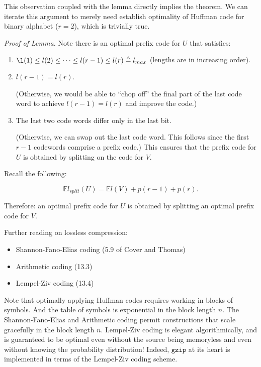 \documentclass[13pt]{article}
\newcommand{\EE}{\mathbb{E}}
\begin{document}
This observation coupled with the lemma directly implies the theorem.  We can iterate this argument to merely need establish optimality of Huffman code for binary alphabet ($r=2$), which is trivially true.

\def\ep{\hfill \blacksquare}
\def\dq{\triangleq}
{\it Proof of Lemma.}  Note there is an optimal prefix code for $U$ that satisfies:

\def\lt{\tidle{l}}
\begin{enumerate}
  \item $\l(1) \leq l(2) \leq \dots \leq l(r-1) \leq l(r) \dq l_{max}$ (lengths are in increasing order).
  \item $l(r-1) = l(r)$.  
    
    (Otherwise, we would be able to ``chop off'' the final part of the last code word to achieve $l(r-1) = l(r)$ and improve the code.)
  \item The last two code words differ only in the last bit.
    
    (Otherwise, we can swap out the last code word.  This follows since the first $r-1$ codewords comprise a prefix code.)  This ensures that the prefix code for $U$ is obtained by splitting on the code for $V$. 
\end{enumerate}


Recall the following:

\[
  \EE l_{split} (U) = \EE l(V) + p(r-1) + p(r).
\]

Therefore: an optimal prefix code for $U$ is obtained by splitting an optimal prefix code for $V$. \ep

Further reading on lossless compression: 

\begin{itemize}
  \item Shannon-Fano-Elias coding (5.9 of Cover and Thomas)
  \item Arithmetic coding (13.3)
  \item Lempel-Ziv coding (13.4)
\end{itemize}

Note that optimally applying Huffman codes requires working in blocks of symbols.  And the table of symbols is exponential in the block length $n$.  The Shannon-Fano-Elias and Arithmetic coding permit constructions that scale gracefully in the block length $n$.  Lempel-Ziv coding is elegant algorithmically, and is guaranteed to be optimal even without the source being memoryless and even without knowing the probability distribution!  Indeed, $\texttt{gzip}$ at its heart is implemented in terms of the Lempel-Ziv coding scheme.
\end{document}
